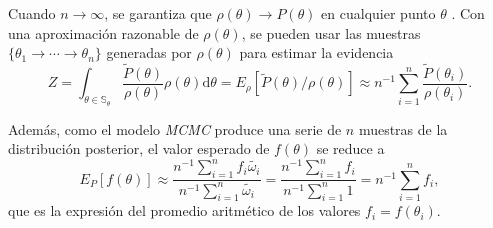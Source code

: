 	Cuando $n\rightarrow\infty$, se garantiza que $\rho(\theta)\rightarrow P(\theta)$ en cualquier punto $\theta$ \cite{brooks_gelman_jones_2011}. Con una aproximación razonable de $\rho(\theta)$, se pueden usar las muestras $\{\theta_1\rightarrow\cdots\rightarrow\theta_n\}$ generadas por $\rho(\theta)$ para estimar la evidencia
	$$Z=\int_{\theta\in\mathbb{S}_\theta}\frac{\tilde{P}(\theta)}{\rho(\theta)}\rho(\theta)\mathrm{d}\theta =E_\rho[\tilde{P}(\theta)/\rho(\theta)]\approx n^{-1}\sum_{i=1}^n \frac{\tilde{P}(\theta_i)}{\rho(\theta_i)}.$$
	
	Además, como el modelo \textit{MCMC} produce una serie de $n$ muestras de la distribución posterior, el valor esperado de $f(\theta)$ se reduce a
	$$E_P[f(\theta)]\approx\frac{n^{-1}\sum_{i=1}^n f_i\tilde{\omega_i}}{n^{-1}\sum_{i=1}^n \tilde{\omega_i}}=\frac{n^{-1}\sum_{i=1}^n f_i}{n^{-1}\sum_{i=1}^n 1}=n^{-1}\sum_{i=1}^n f_i,$$
	que es la expresión del promedio aritmético de los valores $f_i=f(\theta_i).$